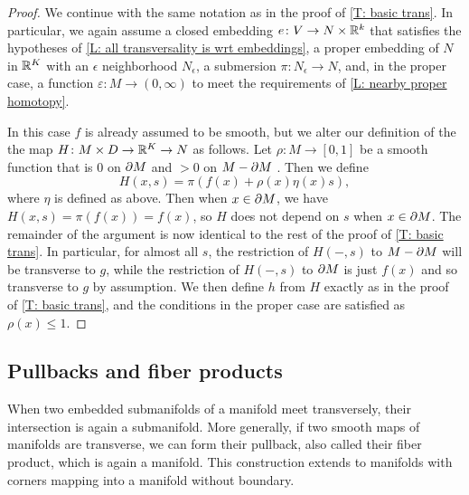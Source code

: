 \begin{proof}
	We continue with the same notation as in the proof of \cref{T: basic trans}.
	In particular, we again assume a closed embedding $e \colon V \to N \times \mathbb{R}^k$ that satisfies the hypotheses of \cref{L: all transversality is wrt embeddings}, a proper embedding of $N$ in $\mathbb{R}^K$ with an $\epsilon$ neighborhood $N_\epsilon$, a submersion $\pi \colon N_\epsilon \to N$, and, in the proper case, a function $\varepsilon \colon M \to (0,\infty)$ to meet the requirements of \cref{L: nearby proper homotopy}.

	In this case $f$ is already assumed to be smooth, but we alter our definition of the the map $H \colon M \times D \to \mathbb{R}^K \to N$ as follows. 
	Let $\rho \colon M \to [0,1]$ be a smooth function that is $0$ on $\partial M$ and $>0$ on $M-\partial M$ \cite[Proposition 5.43]{Lee13}.
	Then we define
	$$H(x,s) = \pi(f(x)+ \rho(x)\eta(x)s),$$
	where $\eta$ is defined as above.
	Then when $x \in \partial M$, we have $H(x,s) = \pi(f(x)) = f(x)$, so $H$ does not depend on $s$ when $x \in \partial M$.
	The remainder of the argument is now identical to the rest of the proof of \cref{T: basic trans}.
	In particular, for almost all $s$, the restriction of $H(-,s)$ to $M - \partial M$ will be transverse to $g$, while the restriction of $H(-,s)$ to $\partial M$ is just $f(x)$ and so transverse to $g$ by assumption. 
	We then define $h$ from $H$ exactly as in the proof of \cref{T: basic trans}, and the conditions in the proper case are satisfied as $\rho(x)\leq 1$.
\end{proof}

\subsection{Pullbacks and fiber products}

When two embedded submanifolds of a manifold meet transversely, their intersection is again a submanifold.
More generally, if two smooth maps of manifolds are transverse, we can form their pullback, also called their fiber product, which is again a manifold.
This construction extends to manifolds with corners mapping into a manifold without boundary.

